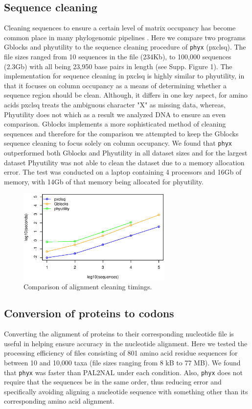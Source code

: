 \documentclass{article}
\begin{document}
\subsection{Sequence cleaning}
Cleaning sequences to ensure a certain level of matrix occupancy has become common place in many phylogenomic pipelines \citep{Dunn2013,YangSmith2014}. Here we compare two programs Gblocks \citep{Gblocks} and phyutility \citep{SmithDunn2008} to the sequence cleaning procedure of \texttt{phyx} (pxclsq). The file sizes ranged from 10 sequences in the file (234Kb), to 100,000 sequences (2.3Gb) with all being 23,950 base pairs in length (see Supp. Figure 1). The implementation for sequence cleaning in pxclsq is highly similar to phyutility, in that it focuses on column occupancy as a means of determining whether a sequence region should be clean. Although, it differs in one key aspect, for amino acids pxclsq treats the ambiguous character "X" as missing data, whereas, Phyutility does not which as a result we analyzed DNA to ensure an even comparison. Gblocks implements a more sophisticated method of cleaning sequences and therefore for the comparison we attempted to keep the Gblocks sequence cleaning to focus solely on column occupancy. We found that \texttt{phyx} outperformed both Gblocks and Phyutility in all dataset sizes and for the largest dataset Phyutility was not able to clean the dataset due to a memory allocation error. The test was conducted on a laptop  containing 4 processors and 16Gb of memory, with 14Gb of that memory being allocated for phyutility.

\begin{figure}[H]
    \centering
    \includegraphics[width=3.0in]{clsq.eps}
    \caption{Comparison of alignment cleaning timings.}
    \label{cleaningfigure}
\label{fig:S1}
\end{figure}

\subsection{Conversion of proteins to codons}
Converting the alignment of proteins to their corresponding nucleotide file is useful in helping ensure accuracy in the nucleotide alignment. Here we tested the processing efficiency of files consisting of 801 amino acid residue sequences for between 10 and 10,000 taxa (file sizes ranging from 8 kB to 77 MB). We found that \texttt{phyx} was faster than PAL2NAL \citep{Suyama2006} under each condition. Also, \texttt{phyx} does not require that the sequences be in the same order, thus reducing error and specifically avoiding aligning a nucleotide sequence with something other than its corresponding amino acid alignment.
\end{document}
